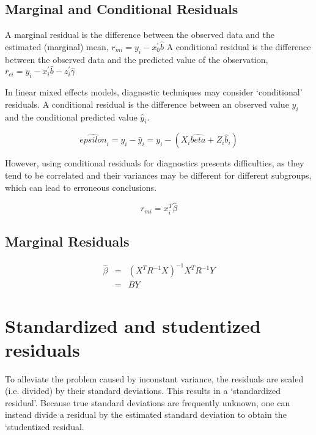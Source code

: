 \documentclass[12pt, a4paper]{report}
\theoremstyle{plain}
\theoremstyle{definition}
\theoremstyle{remark}
\begin{document}
\subsection{Marginal and Conditional Residuals}

A marginal residual is the difference between the observed data and the estimated (marginal) mean, $r_{mi} = y_i - x_0^{\prime} \hat{b}$
A conditional residual is the difference between the observed data and the predicted value of the observation,
$r_{ci} = y_i - x_i^{\prime} \hat{b} - z_i^{\prime} \hat{\gamma}$

In linear mixed effects models, diagnostic techniques may consider `conditional' residuals. A conditional residual is the difference between an observed value $y_{i}$ and the conditional predicted value $\hat{y}_{i} $.

\[ \hat{epsilon}_{i} = y_{i} - \hat{y}_{i} = y_{i} - ( X_{i}\hat{beta} + Z_{i}\hat{b}_{i}) \]

However, using conditional residuals for diagnostics presents difficulties, as they tend to be correlated and their variances may be different for different subgroups, which can lead to erroneous conclusions.







\begin{equation}
r_{mi}=x^{T}_{i}\hat{\beta}
\end{equation}

\subsection{Marginal Residuals}
\begin{eqnarray}
\hat{\beta} &=& (X^{T}R^{-1}X)^{-1}X^{T}R^{-1}Y \nonumber \\
&=& BY \nonumber
\end{eqnarray}

\newpage
\section{Standardized and studentized residuals} %

To alleviate the problem caused by inconstant variance, the residuals are scaled (i.e. divided) by their standard deviations. This results in a `standardized residual'. Because true standard deviations are frequently unknown, one can instead divide a residual by the estimated standard deviation to obtain the `studentized residual. 
\end{document}
